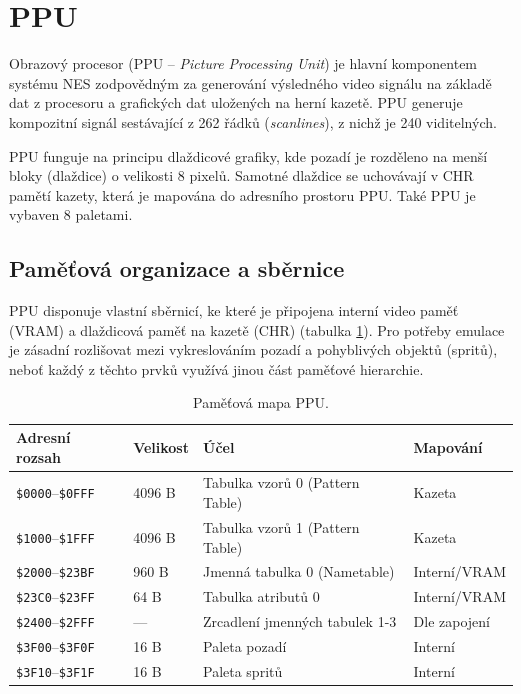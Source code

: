 \section{PPU}
\label{sec:tp-ppu}

Obrazový procesor (PPU -- \textit{Picture Processing Unit}) je hlavní komponentem systému NES
zodpovědným za generování výsledného video signálu na základě dat z procesoru a grafických dat
uložených na herní kazetě. PPU generuje kompozitní signál sestávající z 262 řádků
(\textit{scanlines}), z nichž je 240 viditelných.

PPU funguje na principu dlaždicové grafiky, kde pozadí je rozděleno na menší bloky (dlaždice) o
velikosti 8 pixelů. Samotné dlaždice se uchovávají v CHR pamětí kazety, která je mapována
do adresního prostoru PPU. Také PPU je vybaven 8 paletami.

\subsection{Paměťová organizace a sběrnice}

PPU disponuje vlastní sběrnicí, ke které je připojena interní video paměť (VRAM) a dlaždicová paměť
na kazetě (CHR) (tabulka \ref{tab:ppu_map}). Pro potřeby emulace je zásadní rozlišovat mezi
vykreslováním pozadí a pohyblivých objektů (spritů), neboť každý z těchto prvků využívá jinou část
paměťové hierarchie.

\begin{table}
    \centering
    \begin{tabular}{llp{5cm}l}
        \toprule
        \textbf{Adresní rozsah} & \textbf{Velikost} & \textbf{Účel} & \textbf{Mapování} \\
        \midrule
        \texttt{\$0000}--\texttt{\$0FFF} & 4096 B & Tabulka vzorů 0 (Pattern Table) & Kazeta \\
        \texttt{\$1000}--\texttt{\$1FFF} & 4096 B & Tabulka vzorů 1 (Pattern Table) & Kazeta \\
        \texttt{\$2000}--\texttt{\$23BF} & 960 B  & Jmenná tabulka 0 (Nametable)   & Interní/VRAM \\
        \texttt{\$23C0}--\texttt{\$23FF} & 64 B   & Tabulka atributů 0             & Interní/VRAM \\
        \texttt{\$2400}--\texttt{\$2FFF} & ---    & Zrcadlení jmenných tabulek 1-3 & Dle zapojení \\
        \texttt{\$3F00}--\texttt{\$3F0F} & 16 B   & Paleta pozadí                  & Interní \\
        \texttt{\$3F10}--\texttt{\$3F1F} & 16 B   & Paleta spritů                  & Interní \\
        \bottomrule
    \end{tabular}
    \caption{Paměťová mapa PPU.}
    \label{tab:ppu_map}
\end{table}

